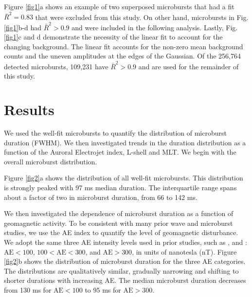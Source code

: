 \documentclass[draft]{agujournal2019}
\begin{document}
Figure \ref{fig1}a shows an example of two superposed microbursts that had a fit $\bar{R}^2 = 0.83$ that were excluded from this study. On other hand, microbursts in Fig. \ref{fig1}b-d had $\bar{R}^2 > 0.9$ and were included in the following analysis. Lastly, Fig. \ref{fig1}c and d demonstrate the necessity of the linear fit to account for the changing background. The linear fit accounts for the non-zero mean background counts and the uneven amplitudes at the edges of the Gaussian. Of the 256,764 detected microbursts, 109,231 have $\bar{R}^2 > 0.9$ and are used for the remainder of this study.

\section{Results}\label{results}
We used the well-fit microbursts to quantify the distribution of microburst duration (FWHM). We then investigated trends in the duration distribution as a function of the Auroral Electrojet index, L-shell and MLT. We begin with the overall microburst distribution.

Figure \ref{fig2}a shows the distribution of all well-fit microbursts. This distribution is strongly peaked with 97 ms median duration. The interquartile range spans about a factor of two in microburst duration, from 66 to 142 ms.

We then investigated the dependence of microburst duration as a function of geomagnetic activity. To be consistent with many prior wave and microburst studies, we use the AE index to quantify the level of geomagnetic disturbance. We adopt the same three AE intensity levels used in prior studies, such as , and : $\mathrm{AE} < 100$, $100 < \mathrm{AE} < 300$, and $\mathrm{AE} > 300$, in units of nanotesla (nT). Figure \ref{fig2}b shows the distribution of microburst duration for the three AE categories. The distributions are qualitatively similar, gradually narrowing and shifting to shorter durations with increasing AE. The median microburst duration decreases from 130 ms for $\mathrm{AE} < 100$ to 95 ms for $ \mathrm{AE} > 300$.
\end{document}
